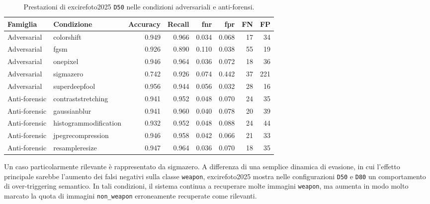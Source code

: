\begin{table}[H]
\centering
\caption{Prestazioni di \gls{excirefoto2025} \texttt{D50} nelle condizioni adversariali e anti-forensi.}
\label{tab:results-excire-d50-attack-metrics}
\scriptsize
\renewcommand{\arraystretch}{1.12}
\setlength{\tabcolsep}{4pt}
\begin{tabular}{@{}l l r r r r r r@{}}
\toprule
\textbf{Famiglia} &
\textbf{Condizione} &
\textbf{Accuracy} &
\textbf{Recall} &
\textbf{\gls{fnr}} &
\textbf{\gls{fpr}} &
\textbf{FN} &
\textbf{FP} \\
\midrule

Adversarial &
\gls{colorshift} &
0.949 &
0.966 &
0.034 &
0.068 &
17 &
34 \\

Adversarial &
\gls{fgsm} &
0.926 &
0.890 &
0.110 &
0.038 &
55 &
19 \\

Adversarial &
\gls{onepixel} &
0.946 &
0.964 &
0.036 &
0.072 &
18 &
36 \\

Adversarial &
\gls{sigmazero} &
0.742 &
0.926 &
0.074 &
0.442 &
37 &
221 \\

Adversarial &
\gls{superdeepfool} &
0.956 &
0.944 &
0.056 &
0.032 &
28 &
16 \\

\midrule

Anti-forensic &
\gls{contraststretching} &
0.941 &
0.952 &
0.048 &
0.070 &
24 &
35 \\

Anti-forensic &
\gls{gaussianblur} &
0.941 &
0.960 &
0.040 &
0.078 &
20 &
39 \\

Anti-forensic &
\gls{histogrammodification} &
0.932 &
0.952 &
0.048 &
0.088 &
24 &
44 \\

Anti-forensic &
\gls{jpegrecompression} &
0.946 &
0.958 &
0.042 &
0.066 &
21 &
33 \\

Anti-forensic &
\gls{resampleresize} &
0.947 &
0.964 &
0.036 &
0.070 &
18 &
35 \\

\bottomrule
\end{tabular}
\end{table}

Un caso particolarmente rilevante è rappresentato da \gls{sigmazero}. A
differenza di una semplice dinamica di evasione, in cui l'effetto principale
sarebbe l'aumento dei falsi negativi sulla classe \texttt{weapon},
\gls{excirefoto2025} mostra nelle configurazioni \texttt{D50} e \texttt{D80} un
comportamento di over-triggering semantico. In tali condizioni, il sistema
continua a recuperare molte immagini \texttt{weapon}, ma aumenta in modo molto
marcato la quota di immagini \texttt{non\_weapon} erroneamente recuperate come
rilevanti.

